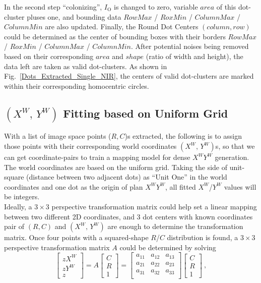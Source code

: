%
In the second step \enquote{colonizing},  \(I_{\text{O}}\) is changed to zero, variable \(area\) of this dot-cluster pluses one, and bounding data \(RowMax\) / \(RoxMin\) / \(ColumnMax\) / \(ColumnMin\) are also updated.%
%
Finally, the Round Dot Centers \((column, row)\) could be determined as the center of bounding boxes with their borders \(RowMax\) / \(RoxMin\) / \(ColumnMax\) / \(ColumnMin\). After potential noises being removed based on their corresponding \(area\) and \(shape\) (ratio of width and height), the data left are taken as valid dot-clusters. As shown in Fig.~\ref{Dots_Extracted_Single_NIR}, the centers of valid dot-clusters are marked within their corresponding homocentric circles.
\subsection{\((X^W, \,Y^W)\) Fitting based on Uniform Grid}
\label{uniformGridFittingXY}
With a list of image space points (\(R, C\))s extracted, the following is to assign those points with their corresponding world coordinates \((X^W, \,Y^W)\)s, so that we can get coordinate-pairs to train a mapping model for dense \(X^WY^W\) generation. The world coordinates are based on the uniform grid. Taking the side of unit-square (distance between two adjacent dots) as \enquote{Unit One} in the world coordinates and one dot as the origin of plan \(X^WY^W\), all fitted \(X^W\)/\(Y^W\) values will be integers. %
\\\indent%
Ideally, a $3\times3$ perspective transformation matrix could help set a linear mapping between two different 2D coordinates, and 3 dot centers with known coordinates pair of \((R, C)\) and \((X^W, \,Y^W)\) are enough to determine the transformation matrix. Once four points with a squared-shape \(R\)/\(C\) distribution is found, a $3\times3$ perspective transformation matrix \(A\) could be determined by solving 
\begin{equation}
%
\left[ \begin{array}{c} %
zX^W \\ zY^W \\ z \end{array} \right] %
= %
A \left[ \begin{array}{c} %
C \\ R \\ 1 \end{array} \right] %
= %
\begin{bmatrix} 
a_{11} & a_{12} & a_{13} \\
a_{21} & a_{22} & a_{23} \\
a_{31} & a_{32} & a_{33} \\
\end{bmatrix}%
 \left[ \begin{array}{c} %
C \\ R \\ 1 \end{array} \right] %
 \ ,%
\label{perspectiveDistortionCorrectionEquation}
\end{equation}%
